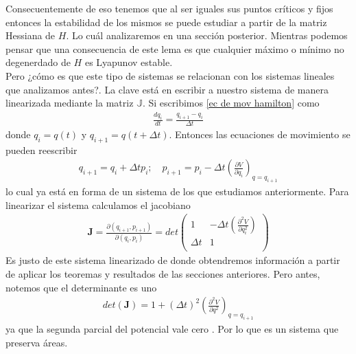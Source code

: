 Consecuentemente de eso tenemos que al ser iguales sus puntos críticos y fijos entonces la estabilidad de los mismos se puede estudiar a partir de la matriz Hessiana de $H$. Lo cuál analizaremos en una sección posterior. Mientras podemos pensar que una consecuencia de este lema es que cualquier máximo o mínimo no degenerdado de $H$ es Lyapunov estable. \\
Pero ¿cómo es que este tipo de sistemas se relacionan con los sistemas lineales que analizamos antes?. La clave está en escribir a nuestro sistema de manera linearizada mediante la matriz $\mathbb{J}$. Si escribimos \ref{ec de mov hamilton} como
\begin{eqnarray*}
\frac{dq_{i}}{dt}=\frac{q_{i+1}-q_{i}}{\Delta t}
\end{eqnarray*}
donde $q_{i}=q(t)$ y $q_{i+1}=q(t+\Delta t)$. Entonces las ecuaciones de movimiento se pueden reescribir 
\begin{eqnarray}
q_{i+1}=q_{i}+\Delta t p_{i} ;\quad p_{i+1}=p_{i}-\Delta t\left( \frac{\partial V}{\partial q_{i} } \right)_{q=q_{i+1}} \label{hamilton sistema dinamico}
\end{eqnarray}
lo cual ya está en forma de un sistema de los que estudiamos anteriormente. Para linearizar el sistema calculamos el jacobiano
\begin{eqnarray}
\mathbf{J}=\frac{\partial(q_{i+1},p_{i+1})}{\partial(q_{i},p_{i})}=
det \begin{pmatrix} 
1 & -\Delta t \left( \frac{\partial^{2} V}{\partial q_{i}^{2} } \right)\\
\Delta t & 1 \\
\end{pmatrix}
\end{eqnarray}
Es justo de este sistema linearizado de donde obtendremos información a partir de aplicar los teoremas y resultados de las secciones anteriores. Pero antes, notemos que el determinante es uno
\begin{eqnarray*}
det(\mathbf{J})=1+(\Delta t)^{2}\left( \frac{\partial^{2} V}{\partial q^{2} } \right)_{q=q_{i+1}}
\end{eqnarray*}
 ya que la segunda parcial del potencial vale cero . Por lo que es un sistema que preserva áreas.









